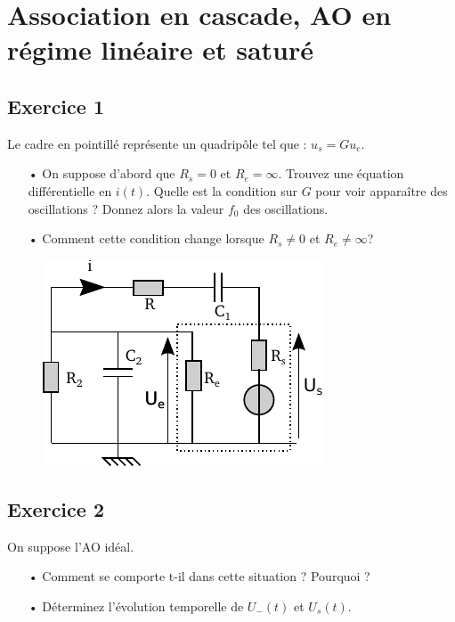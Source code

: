 \documentclass{report}
\begin{document}
\chapter*{Association en cascade, AO en régime linéaire et saturé}

\newpage

\section*{Exercice 1}

Le cadre en pointillé représente un quadripôle tel que : $u_{s}=Gu_{e}$.

\begin{itemize}

\item[•] On suppose d'abord que $R_{s}=0$ et $R_{e}=\infty$. Trouvez  une équation différentielle en $i(t)$. Quelle est la condition sur $G$ pour voir apparaître des oscillations ? Donnez alors la valeur $f_0$ des oscillations.

\item[•] Comment cette condition change lorsque $R_{s}\neq 0$ et $R_{e}\neq\infty$?

\end{itemize}

\begin{figure}[!h]
\centering
\includegraphics[width=0.5\linewidth]{circuit_5.pdf}
\end{figure}

\newpage

\section*{Exercice 2}

On suppose l'AO idéal. 

\begin{itemize}
	\item[•] Comment se comporte t-il dans cette situation ? Pourquoi ?
	\item[•] Déterminez l'évolution temporelle de  $U_{-}(t)$ et $U_{s}(t)$. 
\end{itemize}
\end{document}
